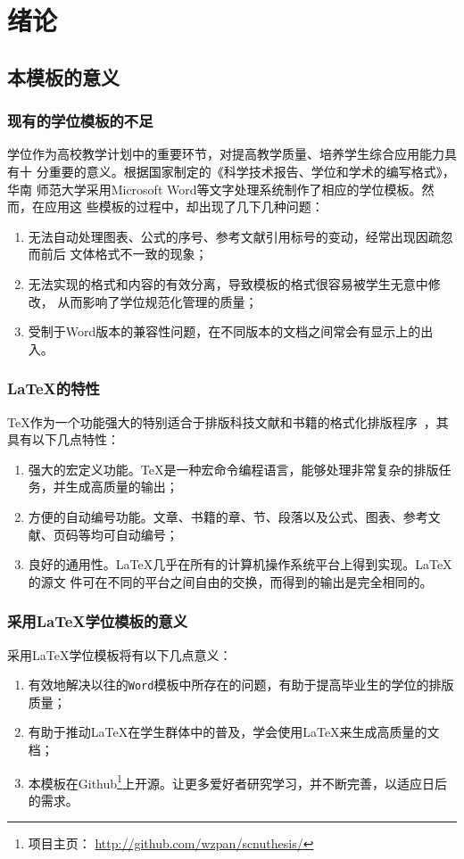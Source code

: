 \chapter{绪论}

\section{本模板的意义}

\subsection{现有的学位模板的不足}
学位作为高校教学计划中的重要环节，对提高教学质量、培养学生综合应用能力具有十%
分重要的意义。根据国家制定的《科学技术报告、学位和学术的编写格式》，华南%
师范大学采用Microsoft Word等文字处理系统制作了相应的学位模板。然而，在应用这%
些模板的过程中，却出现了几下几种问题\cite{Maddage2009}：
\begin{enumerate}
\item 无法自动处理图表、公式的序号、参考文献引用标号的变动，经常出现因疏忽而前后%
  文体格式不一致的现象；
\item 无法实现的格式和内容的有效分离，导致模板的格式很容易被学生无意中修改，%
  从而影响了学位规范化管理的质量；
\item 受制于Word版本的兼容性问题，在不同版本的文档之间常会有显示上的出入。%
\end{enumerate}

\subsection{\LaTeX{}的特性}
\TeX{}作为一个功能强大的特别适合于排版科技文献和书籍的格式化排版程序~，其具有以下几点特性：
\begin{enumerate}
\item 强大的宏定义功能。\TeX{}是一种宏命令编程语言，能够处理非常复杂的排版任务，并生成高质量的输出；
\item 方便的自动编号功能。文章、书籍的章、节、段落以及公式、图表、参考文献、页码等均可自动编号；
\item 良好的通用性。\LaTeX{}几乎在所有的计算机操作系统平台上得到实现。\LaTeX{}的源文%
  件可在不同的平台之间自由的交换，而得到的输出是完全相同的。
\end{enumerate}




\subsection{采用\LaTeX{}学位模板的意义}
采用\LaTeX{}学位模板将有以下几点意义：
\begin{enumerate}
\item 有效地解决以往的\verb|Word|模板中所存在的问题，有助于提高毕业生的学位的排版质量；
\item 有助于推动LaTeX在学生群体中的普及，学会使用\LaTeX{}来生成高质量的文档；
\item 本模板在Github\footnote{项目主页：
    \url{http://github.com/wzpan/scnuthesis/}}上开源。让更多爱好者研究学习，并不断完善，以适应日后的需求。
\end{enumerate}


